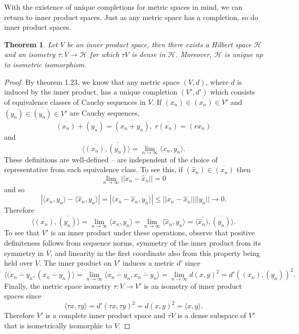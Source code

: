 \documentclass[psamsfonts]{amsart}
\newtheorem{thm}{Theorem}[section]
\theoremstyle{definition}
\theoremstyle{remark}
\numberwithin{equation}{section}
\begin{document}
With the existence of unique completions for metric spaces in mind, we can return to inner product spaces. Just as any metric space has a completion, so do inner product spaces. 

\begin{thm}
Let $V$ be an inner product space, then there exists a Hilbert space $\mathcal{H}$ and an isometry $\tau : V \rightarrow \mathcal{H}$ for which $\tau V$ is dense in $\mathcal{H}$. Moreover, $\mathcal{H}$ is unique up to isometric isomorphism. 
\end{thm}

\begin{proof}
By theorem 1.23, we know that any metric space $(V,d)$, where $d$ is induced by the inner product, has a unique completion $(V', d')$ which consists of equivalence classes of Cauchy sequences in $V$. If $(x_n) \in \overline{(x_n)} \in V'$ and $(y_n) \in \overline{(y_n)} \in V'$ are Cauchy sequences, 
$$\overline{(x_n)} + \overline{(y_n)} = \overline{(x_n +y_n)}, \; r \overline{(x_n)} = \overline{(rx_n)} $$
and 
$$\langle \overline{(x_n)}, \overline{(y_n)} \rangle = \lim _{n \rightarrow \infty} \langle x_n, y_n \rangle . $$
These definitions are well-defined -- are independent of the choice of representative from each equivalence class. To see this, if $(\hat{x}_n ) \in \overline{(x_n)}$ then 
$$\lim _{n \rightarrow \infty} || x_n - \hat{x}_n || = 0 $$
and so 
$$|\langle x_n , y_n \rangle - \langle \hat{x} _n , y_n \rangle | = | \langle x_n - \hat{x} _n , y_n \rangle | \leq || x_n - \hat{x}_n || || y_n || \rightarrow 0.  $$
Therefore 
$$\langle \overline{(x_n)}, \overline{(y_n)} \rangle = \lim _{n \rightarrow \infty} \langle x_n ,y_n \rangle = \lim _{n \rightarrow \infty} \langle \hat{x}_n , y_n \rangle = \langle \overline{\hat{x}_n)}, \overline{(y_n)} \rangle.  $$
To see that $V'$ is an inner product under these operations, observe that positive definiteness follows from sequence norms, symmetry of the inner product from its symmetry in $V$, and linearity in the first coordinate also from this property being held over $V$. The inner product on $V'$ induces a metric $d'$ since 
$$\langle (\overline{x_n - y_n}, (\overline{x_n - y_n})\rangle = \lim _{n \rightarrow \infty} \langle \overline{x_n - y_n}, \overline{x_n - y_n} \rangle = \lim _{n \rightarrow \infty} d(x,y)^2 = d'((x_n), (y_n)) ^2. $$
Finally, the metric space isometry $\tau: V \rightarrow V'$ is an isometry of inner product spaces since 
$$\langle \tau x, \tau y \rangle = d'(\tau x, \tau y )^2 = d(x,y)^2 = \langle x, y \rangle.  $$
Therefore $V'$ is a complete inner product space and $\tau V$ is a dense subspace of $V'$ that is isometrically isomorphic to $V$. 

\end{proof}
\end{document}
